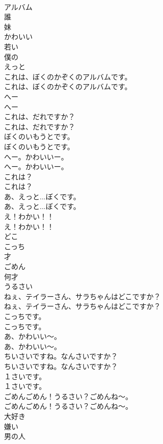 \documentclass[8pt]{extreport}
\begin{document}
\begin{CJK}{UTF8}{min}
\\	アルバム
\\	誰
\\	妹
\\	かわいい
\\	若い
\\	僕の
\\	えっと
\\	これは、ぼくのかぞくのアルバムです。	
\\	これは、ぼくのかぞくのアルバムです。 
\\	へー
\\	へー
\\	これは、だれですか？	
\\	これは、だれですか？ 
\\	ぼくのいもうとです。	
\\	ぼくのいもうとです。 
\\	へー。かわいいー。	
\\	へー。かわいいー。 
\\	これは？	
\\	これは？ 
\\	あ、えっと...ぼくです。	
\\	あ、えっと...ぼくです。 
\\	え！わかい！！	
\\	え！わかい！！ 
\\	どこ
\\	こっち
\\	才
\\	ごめん
\\	何才
\\	うるさい
\\	ねぇ、テイラーさん、サラちゃんはどこですか？	
\\	ねぇ、テイラーさん、サラちゃんはどこですか？ 
\\	こっちです。	
\\	こっちです。 
\\	あ、かわいい～。	
\\	あ、かわいい～。 
\\	ちいさいですね。なんさいですか？	
\\	ちいさいですね。なんさいですか？ 
\\	１さいです。	
\\	１さいです。 
\\	ごめんごめん！うるさい？ごめんね～。	
\\	ごめんごめん！うるさい？ごめんね～。 
\\	大好き
\\	嫌い
\\	男の人

\end{CJK}
\end{document}
